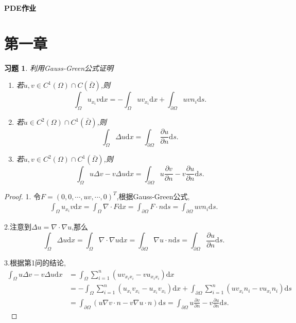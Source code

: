 \documentclass[a4paper,oneside,12pt]{ctexart}
\theoremstyle{plain}
\newtheorem{exercise}{习题}[section]
\theoremstyle{nonumberplain}
\theoremstyle{nonumberplain}
\newtheorem{proof}{证明.}
\newcommand{\dif}{\mathrm{d}}
\newcommand{\ptl}{\partial}
\begin{document}
    \begin{center}
        \LARGE\bfseries
        PDE作业
    \end{center}

    \section{第一章}
    
    \begin{exercise}\label{ex:1.1}
        利用Gauss-Green公式证明
        \begin{enumerate}
            \item 若$u,v\in C^1(\Omega)\cap C(\bar{\Omega})$,则\begin{equation*}
                \int_\Omega u_{x_i}v\dif x=-\int_\Omega uv_{x_i}\dif x+\int_{\ptl\Omega} uvn_i\dif s.
            \end{equation*}
            \item 若$u\in C^2(\Omega)\cap C^1(\bar{\Omega})$,则\begin{equation*}
                \int_\Omega \Delta u\dif x=\int_{\ptl\Omega}\frac{\ptl u}{\ptl n}\dif s.
            \end{equation*}
            \item 若$u,v\in C^2(\Omega)\cap C^1(\bar{\Omega})$,则\begin{equation*}
                \int_\Omega u\Delta v-v\Delta u\dif x=\int_{\ptl \Omega}u\frac{\ptl v}{\ptl n}-v\frac{\ptl u}{\ptl n}\dif s.
            \end{equation*}
        \end{enumerate}
    \end{exercise}

    \begin{proof}
        1. 令$F=(0,0,\cdots,uv,\cdots,0)^T$,根据Gauss-Green公式, 
        \begin{align*}
            \int_\Omega u_{x_i}v\dif x=\int_\Omega \nabla\cdot F\dif x=\int_{\ptl\Omega}F\cdot n\dif s=\int_{\ptl\Omega}uvn_i\dif s.
        \end{align*}

        2.注意到$\Delta u=\nabla\cdot \nabla u$,那么
        \begin{equation*}
            \int_\Omega \Delta u\dif x=\int_\Omega \nabla\cdot\nabla u\dif x=\int_{\ptl\Omega} \nabla u\cdot n\dif s=\int_{\ptl\Omega}\frac{\ptl u}{\ptl n}\dif s.
        \end{equation*}

        3.根据第1问的结论,
        \begin{align*}
            \int_\Omega u\Delta v-v\Delta u\dif x&=\int_\Omega \sum_{i=1}^n\left(uv_{x_ix_i}-vu_{x_ix_i}\right)\dif x\\
            &=-\int_\Omega\sum_{i=1}^n(u_{x_i}v_{x_i}-u_{x_i}v_{x_i})\dif x+\int_{\ptl\Omega}\sum_{i=1}^n(uv_{x_i}n_i-vu_{x_i}n_i)\dif s\\
            &=\int_{\ptl\Omega}(u\nabla v\cdot n-v\nabla u\cdot n)\dif s=\int_{\ptl \Omega}u\frac{\ptl v}{\ptl n}-v\frac{\ptl u}{\ptl n}\dif s.
        \end{align*}
        \ 
    \end{proof}
\end{document}
